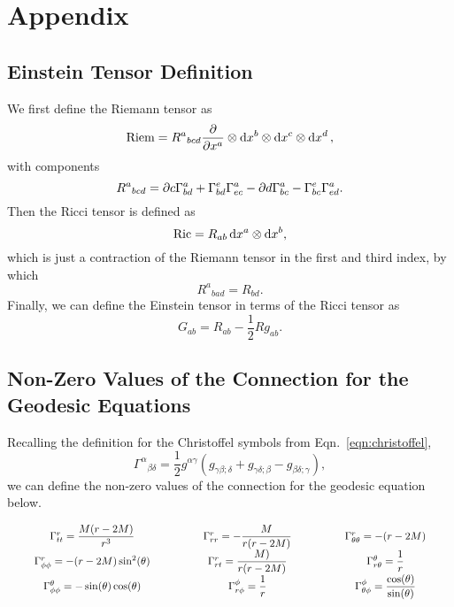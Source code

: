\onecolumn
\section{Appendix}
\subsection{Einstein Tensor Definition}
\label{apx:einsteintensor}
We first define the Riemann tensor as
\begin{equation}
\text{Riem}=R^a{}_{bcd}\pdv{}{x^a}\otimes\odif{x^b}\otimes\dd{x^c}\otimes\dd{x^d},
\end{equation}
with components
\begin{equation}
R^a{}_{bcd}=\pdif*{c}\Gamma^a_{bd}+\Gamma^e_{bd}\Gamma^a_{ec}-\pdif*{d}\Gamma^a_{bc}-\Gamma^e_{bc}\Gamma^a_{ed}.
\end{equation}
Then the Ricci tensor is defined as
\begin{equation}
\text{Ric}=R_{ab}\odif{x^a}\otimes\odif{x^b},
\end{equation}
which is just a contraction of the Riemann tensor in the first and third index, by which
\begin{equation}
R^a{}_{bad}=R_{bd}.
\end{equation}
Finally, we can define the Einstein tensor in terms of the Ricci tensor as
\begin{equation}
G_{ab}=R_{ab}-\frac{1}{2}Rg_{ab}.
\end{equation}

\subsection{Non-Zero Values of the Connection for the Geodesic Equations}
\label{apx:connectionvalues}
Recalling the definition for the Christoffel symbols from Eqn.~\eqref{eqn:christoffel},
\begin{equation}
\Gamma^\alpha{}_{\beta\delta}=\frac{1}{2}g^{\alpha \gamma}(g_{\gamma\beta;\delta}+g_{\gamma\delta;\beta}-g_{\beta\delta;\gamma}),
\end{equation}
we can define the non-zero values of the connection for the geodesic equation below.

$$\arraycolsep=25pt
\begin{array}{ccc}
\Gamma^r_{tt}=\dfrac{M(r-2M)}{r^3} & \Gamma^r_{rr}=-\dfrac{M}{r(r-2M)} & \Gamma^r_{\theta\theta}=-(r-2M)\\
\Gamma^r_{\phi\phi}=-(r-2M)\sin^2(\theta) & \Gamma^r_{rt}=\dfrac{M)}{r(r-2M)} & \Gamma^\theta_{r\theta}=\dfrac{1}{r}\\
\Gamma^\theta_{\phi\phi}=-\sin(\theta)\cos(\theta) & \Gamma^\phi_{r\phi}=\dfrac{1}{r} & \Gamma^\phi_{\theta\phi}=\dfrac{\cos(\theta)}{\sin(\theta)}
\end{array}$$

